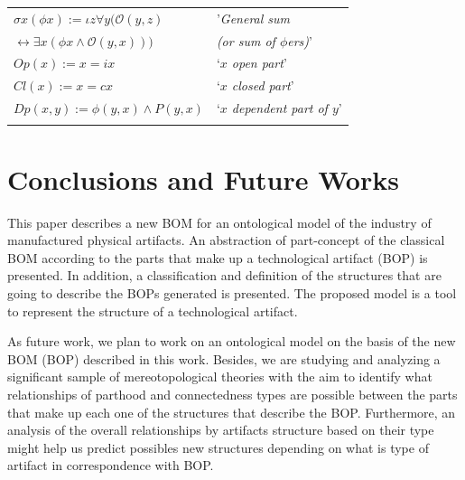 \documentclass[runningheads,a4paper]{llncs}
\begin{document}
\begin{table}
\begin{tabular}{ll}
 \noalign{\smallskip}\hline\noalign{\smallskip}
$\sigma{x}(\phi{x}):=\iota{z}\forall{y}({\mathcal{O}}(y,z)$ & '\textit{General sum}\\
$\leftrightarrow\exists{x}(\phi{x}\wedge{\mathcal{O}}(y,x)))$ & \textit{(or sum of $\phi$ers)}' \\
\noalign{\smallskip}\hline\noalign{\smallskip}
${Op}(x) := {x}={ix}$ & `\textit{$x$ open part}' \\
\noalign{\smallskip}\hline\noalign{\smallskip}
${Cl}(x) := {x}={cx}$ & `\textit{$x$ closed part}' \\
\noalign{\smallskip}\hline\noalign{\smallskip}
${Dp}(x,y) :=\phi(y,x)\wedge{P}(y,x)$ & `\textit{$x$ dependent part of $y$}' \\
\noalign{\smallskip}\hline
\end{tabular}
\end{table}

\section{Conclusions and Future Works} \label{C}
This paper describes a new BOM for an ontological model of the industry of manufactured physical artifacts. An abstraction of part-concept of the classical BOM according to the parts that make up a technological artifact (BOP) is presented. In addition, a classification and definition of the structures that are going to describe the BOPs generated is presented. The proposed model is a tool to represent the structure of a technological artifact.
 
As future work, we plan to work on an ontological model on the basis of the new BOM (BOP) described in this work. Besides, we are studying and analyzing a significant sample of mereotopological theories with the aim to identify what relationships of parthood and connectedness types are possible between the parts that make up each one of the structures that describe the BOP. Furthermore, an analysis of the overall relationships by artifacts structure based on their type might help us predict possibles new structures depending on what is type of artifact in correspondence with BOP.




\end{document}
